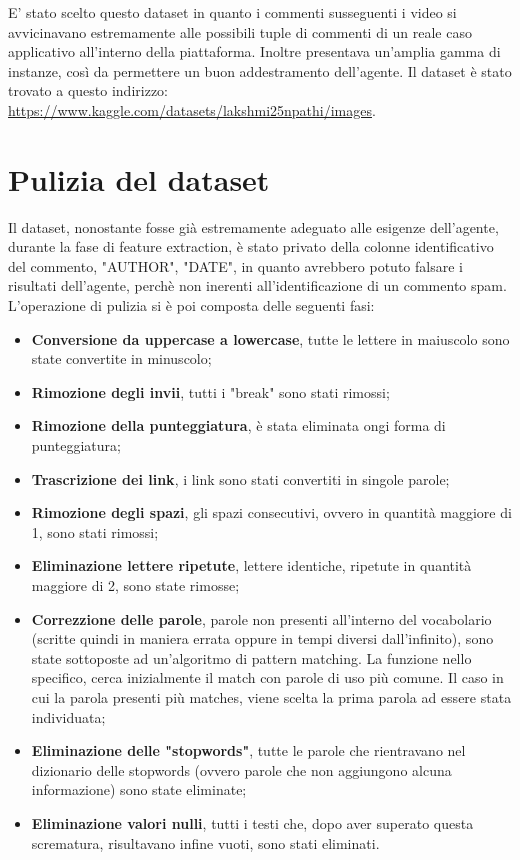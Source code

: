 \documentclass{report}
\begin{document}
    E' stato scelto questo dataset in quanto i commenti susseguenti i video si avvicinavano estremamente alle possibili tuple di commenti
    di un reale caso applicativo all'interno della piattaforma.
    Inoltre presentava un'amplia gamma di instanze, così da permettere un buon addestramento dell'agente.
    Il dataset è stato trovato a questo indirizzo: \newline 
    \href{https://www.kaggle.com/datasets/lakshmi25npathi/images}{https://www.kaggle.com/datasets/lakshmi25npathi/images}.
    
    \section{Pulizia del dataset}
    Il dataset, nonostante fosse già estremamente adeguato alle esigenze dell'agente, durante la fase di feature extraction, 
    è stato privato della colonne identificativo del commento, "AUTHOR", "DATE", in quanto avrebbero potuto falsare i risultati dell'agente, 
    perchè non inerenti all'identificazione di un commento spam.
    L'operazione di pulizia si è poi composta delle seguenti fasi: 
    \begin{itemize}
        \item {\bfseries Conversione da uppercase a lowercase}, tutte le lettere in maiuscolo sono state convertite in minuscolo;
        \item {\bfseries Rimozione degli invii}, tutti i "break" sono stati rimossi;
        \item {\bfseries Rimozione della punteggiatura}, è stata eliminata ongi forma di punteggiatura;
        \item {\bfseries Trascrizione dei link}, i link sono stati convertiti in singole parole;
        \item {\bfseries Rimozione degli spazi}, gli spazi consecutivi, ovvero in  quantità maggiore di 1, sono stati rimossi;
        \item {\bfseries Eliminazione lettere ripetute}, lettere identiche, ripetute in quantità maggiore di 2, sono state rimosse;
        \item {\bfseries Correzzione delle parole}, parole non presenti all'interno del vocabolario (scritte quindi in maniera errata oppure in tempi diversi dall'infinito), sono state sottoposte 
        ad un'algoritmo di pattern matching. La funzione nello specifico, cerca inizialmente il match con parole di uso più comune. Il caso in cui
        la parola presenti più matches, viene scelta la prima parola ad essere stata individuata;
        \item {\bfseries Eliminazione delle "stopwords"}, tutte le parole che rientravano nel dizionario delle stopwords (ovvero parole che non aggiungono alcuna informazione) 
        sono state eliminate;
        \item {\bfseries Eliminazione valori nulli}, tutti i testi che, dopo aver superato questa scrematura, risultavano infine vuoti, sono stati eliminati.

    \end{itemize}
\end{document}
